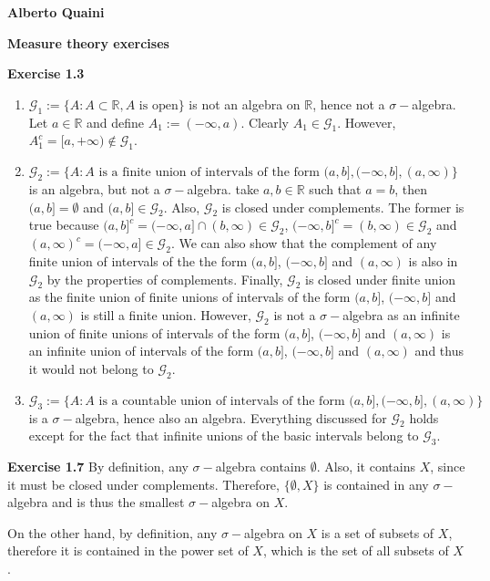 \documentclass[11.5pt, letterpaper, bibtotoc,
    tablecaptionabove, figurecaptionabove]{article}
\begin{document}
\textbf{Alberto Quaini}

\textbf{\Large Measure theory exercises}

\textbf{Exercise 1.3}
\begin{enumerate}
\item
$\mathcal G_1 := \{A: A\subset\mathbb R, A \text{ is open}\}$ is not an algebra on $\mathbb R$, hence not a $\sigma-$algebra.
Let $a\in\mathbb R$ and define $A_1:=(-\infty, a)$. 
Clearly $A_1\in\mathcal G_1$.
However, $A_1^c = [a, +\infty)\notin\mathcal G_1$.

\item
$\mathcal G_2 := \{A: A \text{ is a finite union of intervals of the form } (a, b], (-\infty, b], (a, \infty)\}$ is an algebra, but not a $\sigma-$algebra.
take $a,b\in\mathbb R$ such that $a = b$, then $(a, b]=\emptyset$ and $(a, b]\in\mathcal G_2$.
Also, $\mathcal G_2$ is closed under complements.
The former is true because $(a, b]^c=(-\infty, a]\cap(b, \infty)\in\mathcal G_2$,
$(-\infty, b]^c=(b, \infty)\in\mathcal G_2$ and $(a, \infty)^c=(-\infty, a]\in\mathcal G_2$.
We can also show that the complement of any finite union of intervals of the the form
$(a, b]$, $(-\infty, b]$ and $(a, \infty)$ is also in $\mathcal G_2$ by the properties of complements.
Finally, $\mathcal G_2$ is closed under finite union as the finite union of finite unions of intervals of the form $(a, b]$, $(-\infty, b]$ and $(a, \infty)$ is still a finite union.
However, $\mathcal G_2$ is not a $\sigma-$algebra as an infinite union of finite unions of intervals of the form $(a, b]$, $(-\infty, b]$ and $(a, \infty)$ is an infinite union of intervals of the form $(a, b]$, $(-\infty, b]$ and $(a, \infty)$ and thus it would not belong to $\mathcal G_2$.

\item
$\mathcal G_3 := \{A: A \text{ is a countable union of intervals of the form } (a, b], (-\infty, b], (a, \infty)\}$ is a $\sigma-$algebra, hence also an algebra.
Everything discussed for $\mathcal G_2$ holds except for the fact that infinite unions of the basic intervals belong to $\mathcal G_3$. 

\end{enumerate}

\textbf{Exercise 1.7}
By definition, any $\sigma-$algebra contains $\emptyset$.
Also, it contains $X$, since it must be closed under complements.
Therefore, $\{\emptyset, X\}$ is contained in any $\sigma-$algebra and is thus the smallest $\sigma-$algebra on $X$.

On the other hand, by definition, any $\sigma-$algebra on $X$ is a set of subsets of $X$, 
therefore it is contained in the power set of $X$, which is the set of all subsets of $X$.
\end{document}
